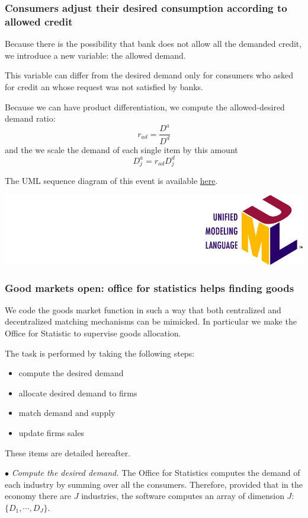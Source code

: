 \documentclass{book}
\newcommand{\umllocation}{file:///Users/giulioni/Dropbox/svn/sfcabm_my/documentation}
\begin{document}
\subsubsection{Consumers adjust their desired consumption according to allowed credit} 

Because there is the possibility that bank does not allow all the demanded credit, we introduce a new variable: the allowed demand. 

This variable can differ from the desired demand only for consumers who asked for credit an whose request was not satisfied by banks.

Because we can have product differentiation, we compute the allowed-desired demand ratio:
\[
	r_{ad}=\frac{D^a}{D^d}
\]
and the we scale the demand of each single item by this amount
\[
	D_j^a=r_{ad}D_j^d
\]

The UML sequence diagram of this event is available \href{\umllocation/adjustConsumptionAccordingToExtendedCredit.html}{here}.
\begin{marginfigure}
	\includegraphics[scale=0.1]{uml.png}
\end{marginfigure}

\subsubsection{Good markets open: office for statistics helps finding goods}
We code the goods market function in such a way that both centralized and decentralized matching mechanisms can be mimicked. 
In particular we make the Office for Statistic to supervise goods allocation.

The task is performed by taking the following steps:
\begin{itemize}
	\item compute the desired demand
	\item allocate desired demand to firms
	\item match demand and supply
	\item update firms sales
\end{itemize}
These items are detailed hereafter.

\noindent$\bullet$ \textit{Compute the desired demand.} The Office for Statistics computes the demand of each industry by summing over all the consumers. Therefore, provided that in the economy there are $J$ industries, the software computes an array of dimension $J$: $\{D_1,\cdots,D_J\}$.
\end{document}
